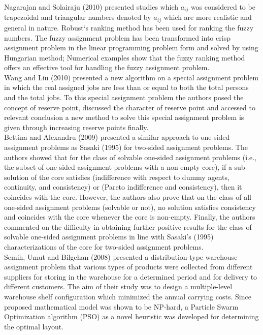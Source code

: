 \documentclass[11pt]{report}
\newcommand{\NI}{\noindent}
\begin{document}
	\NI Nagarajan and Solairaju (2010) presented studies which $a_{ij}$ was considered to be trapezoidal and triangular numbers denoted by $a_{ij}$ which are more realistic and general in nature. Robust‘s ranking method has been used for ranking the fuzzy numbers. The fuzzy assignment problem has been transformed into crisp assignment problem in the linear programming problem form and solved by using Hungarian method; Numerical examples show that the fuzzy ranking method offers an effective tool for handling the fuzzy assignment problem.\\
	
	\NI Wang and Liu (2010) presented a new algorithm on a special assignment problem in which the real assigned jobs are less than or equal to both the total persons and the total jobs. To this special assignment problem the authors posed the concept of reserve point, discussed the character of
	reserve point and accessed to relevant conclusion a new method to solve this special assignment problem is given through increasing reserve points finally.\\
	
	\NI Bettina and Alexandru (2009) presented a similar approach to one-sided assignment problems as Sasaki (1995) for two-sided assignment problems. The authors showed that for the class of solvable one-sided assignment problems (i.e., the subset of one-sided assignment problems with a
	non-empty core), if a sub-solution of the core satisfies (indifference with respect to dummy agents, continuity, and consistency) or (Pareto indifference and consistency), then it coincides with the core. However, the authors also prove that on the class of all one-sided assignment problems
	(solvable or not), no solution satisfies consistency and coincides with the core whenever the core is non-empty. Finally, the authors commented on the difficulty in obtaining further positive results for the class of solvable one-sided assignment problems in line with Sasaki's (1995) characterizations of the core for two-sided assignment problems.\\
	
	\NI Semih, Umut and Bilgehan (2008) presented a distribution-type warehouse assignment problem that various types of products were collected from different suppliers for storing in the warehouse for a determined period and for delivery to different customers. The aim of their study was to
	design a multiple-level warehouse shelf configuration which minimized the annual carrying costs. Since proposed mathematical model was shown to be NP-hard, a Particle Swarm Optimization algorithm (PSO) as a novel heuristic was developed for determining the optimal layout.\\
	
\end{document}
